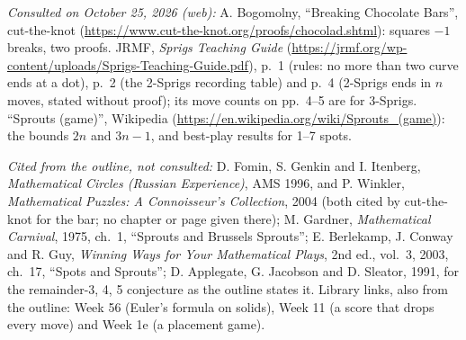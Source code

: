 \emph{Consulted on October 25, 2026 (web):} A. Bogomolny, ``Breaking Chocolate Bars'', cut-the-knot (\url{https://www.cut-the-knot.org/proofs/chocolad.shtml}): squares $-1$ breaks, two proofs. JRMF, \emph{Sprigs Teaching Guide} (\url{https://jrmf.org/wp-content/uploads/Sprigs-Teaching-Guide.pdf}), p.~1 (rules: no more than two curve ends at a dot), p.~2 (the 2-Sprigs recording table) and p.~4 (2-Sprigs ends in $n$ moves, stated without proof); its move counts on pp.~4--5 are for 3-Sprigs. ``Sprouts (game)'', Wikipedia (\url{https://en.wikipedia.org/wiki/Sprouts_(game)}): the bounds $2n$ and $3n-1$, and best-play results for 1--7 spots.

\emph{Cited from the outline, not consulted:} D. Fomin, S. Genkin and I. Itenberg, \emph{Mathematical Circles (Russian Experience)}, AMS 1996, and P. Winkler, \emph{Mathematical Puzzles: A Connoisseur's Collection}, 2004 (both cited by cut-the-knot for the bar; no chapter or page given there); M. Gardner, \emph{Mathematical Carnival}, 1975, ch.~1, ``Sprouts and Brussels Sprouts''; E. Berlekamp, J. Conway and R. Guy, \emph{Winning Ways for Your Mathematical Plays}, 2nd ed., vol.~3, 2003, ch.~17, ``Spots and Sprouts''; D. Applegate, G. Jacobson and D. Sleator, 1991, for the remainder-3, 4, 5 conjecture as the outline states it. Library links, also from the outline: Week 56 (Euler's formula on solids), Week 11 (a score that drops every move) and Week 1e (a placement game).
